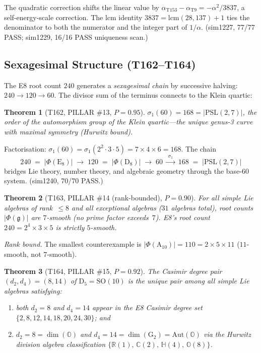 \documentclass[aps,prd,twocolumn,superscriptaddress,floatfix,nofootinbib]{revtex4-2}
\newtheorem{theorem}{Theorem}
\theoremstyle{definition}
\theoremstyle{remark}
\begin{document}
\noindent
The quadratic correction shifts the linear value by
$\alpha_{\mathrm{T153}} - \alpha_{\mathrm{T9}} = -\alpha^2/3837$,
a self-energy-scale correction.  The lcm identity
$3837 = \mathrm{lcm}(28, 137) + 1$ ties the denominator to both
the numerator and the integer part of $1/\alpha$.
(sim1227, 77/77 PASS; sim1229, 16/16 PASS uniqueness scan.)

\subsection{Sexagesimal Structure (T162--T164)}
\label{sec:sexagesimal}

The E8 root count $240$ generates a \emph{sexagesimal chain} by
successive halving: $240 \to 120 \to 60$.  The divisor sum of the
terminus connects to the Klein quartic:

\begin{theorem}[T162, PILLAR \#13, $P{=}0.95$]
$\sigma_1(60) = 168 = |\mathrm{PSL}(2,7)|$, the order of the
automorphism group of the Klein quartic---the unique genus-3 curve
with maximal symmetry (Hurwitz bound).
\end{theorem}

\noindent
Factorisation: $\sigma_1(60) = \sigma_1(2^2 \cdot 3 \cdot 5)
= 7 \times 4 \times 6 = 168$.  The chain
\[
  240 \;=\; |\Phi(\mathrm{E}_8)| \;\to\; 120 \;=\;
  |\Phi(\mathrm{D}_8)| \;\to\; 60
  \;\xrightarrow{\;\sigma_1\;}\; 168 \;=\; |\mathrm{PSL}(2,7)|
\]
bridges Lie theory, number theory, and algebraic geometry through
the base-60 system.  (sim1240, 70/70 PASS.)

\begin{theorem}[T163, PILLAR \#14 (rank-bounded), $P{=}0.90$]
For all simple Lie algebras of rank~$\le 8$ and all exceptional
algebras ($31$ algebras total), root counts $|\Phi(\mathfrak{g})|$
are $7$-smooth (no prime factor exceeds~$7$).  E8's root count
$240 = 2^4 \times 3 \times 5$ is strictly $5$-smooth.
\end{theorem}

\noindent
\emph{Rank bound.}  The smallest counterexample is
$|\Phi(\mathrm{A}_{10})| = 110 = 2 \times 5 \times 11$
($11$-smooth, not $7$-smooth).

\begin{theorem}[T164, PILLAR \#15, $P{=}0.92$]
The Casimir degree pair $(d_2, d_4) = (8, 14)$ of
$\mathrm{D}_5 = \mathrm{SO}(10)$ is the unique pair among all
simple Lie algebras satisfying:
\begin{enumerate}
  \item both $d_2 = 8$ and $d_4 = 14$ appear in the E8 Casimir
        degree set $\{2, 8, 12, 14, 18, 20, 24, 30\}$; and
  \item $d_2 = 8 = \dim(\mathbb{O})$ and
        $d_4 = 14 = \dim(\mathrm{G}_2) = \mathrm{Aut}(\mathbb{O})$
        via the Hurwitz division algebra classification
        $\{\mathbb{R}(1),\, \mathbb{C}(2),\, \mathbb{H}(4),\,
        \mathbb{O}(8)\}$.
\end{enumerate}
\end{theorem}
\end{document}
